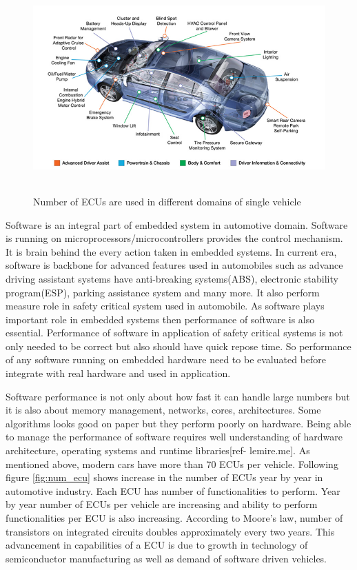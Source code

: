 \begin{figure}[h!]
\includegraphics[width=12cm, height=8cm]{./images/ecus_in_car}
\centering
\caption{Number of ECUs are used in different domains of single vehicle}
\label{fig:ecu}
\end{figure}

\par Software is an integral part of embedded system in automotive domain. Software is running on microprocessors/microcontrollers provides the control mechanism. It is brain behind the every action taken in embedded systems. In current era, software is backbone for advanced features used in automobiles such as advance driving assistant systems have anti-breaking systems(ABS), electronic stability program(ESP), parking assistance system and many more. It also perform measure role in safety critical system used in automobile. As software plays important role in embedded systems then performance of software is also essential. Performance of software in application of safety critical systems is not only needed to be correct but also should have quick repose time. So performance of any software running on embedded hardware need to be evaluated before integrate with real hardware and used in application. 

\par Software performance is not only about how fast it can handle large numbers but it is also about memory management, networks, cores, architectures. Some algorithms looks good on paper but they perform poorly on hardware. Being able to manage the performance of software requires well understanding of hardware architecture, operating systems and runtime libraries[ref- lemire.me].  As mentioned above, modern cars have more than 70 ECUs per vehicle.  Following figure \ref{fig:num_ecu} shows increase in the number of ECUs year by year in automotive industry. Each ECU has number of functionalities to perform. Year by year number of ECUs per vehicle are increasing and ability to perform functionalities per ECU is also increasing. According to Moore's law, number of transistors on integrated circuits doubles approximately every two years. This advancement in capabilities of a ECU is due to growth in technology of semiconductor manufacturing as well as demand of software driven vehicles.  

